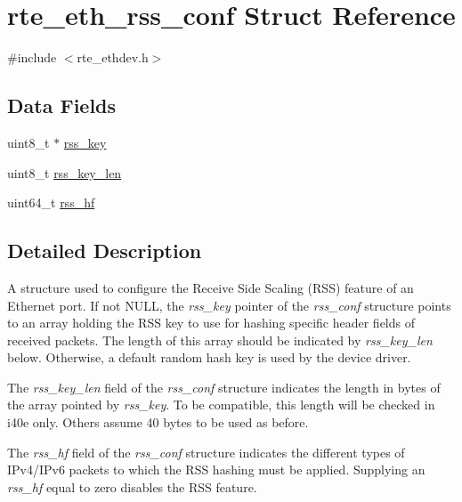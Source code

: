 \hypertarget{structrte__eth__rss__conf}{}\section{rte\+\_\+eth\+\_\+rss\+\_\+conf Struct Reference}
\label{structrte__eth__rss__conf}


{\ttfamily \#include $<$rte\+\_\+ethdev.\+h$>$}

\subsection*{Data Fields}
\begin{DoxyCompactItemize}
\item 
uint8\+\_\+t $\ast$ \hyperlink{structrte__eth__rss__conf_a931e368ed1b5a8211a963bc05c503739}{rss\+\_\+key}
\item 
uint8\+\_\+t \hyperlink{structrte__eth__rss__conf_ab8f32e03af342f65e890c42b24511866}{rss\+\_\+key\+\_\+len}
\item 
uint64\+\_\+t \hyperlink{structrte__eth__rss__conf_ad70f17882a835e5d4e38c64a9f872fdc}{rss\+\_\+hf}
\end{DoxyCompactItemize}


\subsection{Detailed Description}
A structure used to configure the Receive Side Scaling (R\+S\+S) feature of an Ethernet port. If not N\+U\+L\+L, the {\itshape rss\+\_\+key} pointer of the {\itshape rss\+\_\+conf} structure points to an array holding the R\+S\+S key to use for hashing specific header fields of received packets. The length of this array should be indicated by {\itshape rss\+\_\+key\+\_\+len} below. Otherwise, a default random hash key is used by the device driver.

The {\itshape rss\+\_\+key\+\_\+len} field of the {\itshape rss\+\_\+conf} structure indicates the length in bytes of the array pointed by {\itshape rss\+\_\+key}. To be compatible, this length will be checked in i40e only. Others assume 40 bytes to be used as before.

The {\itshape rss\+\_\+hf} field of the {\itshape rss\+\_\+conf} structure indicates the different types of I\+Pv4/\+I\+Pv6 packets to which the R\+S\+S hashing must be applied. Supplying an {\itshape rss\+\_\+hf} equal to zero disables the R\+S\+S feature. 

